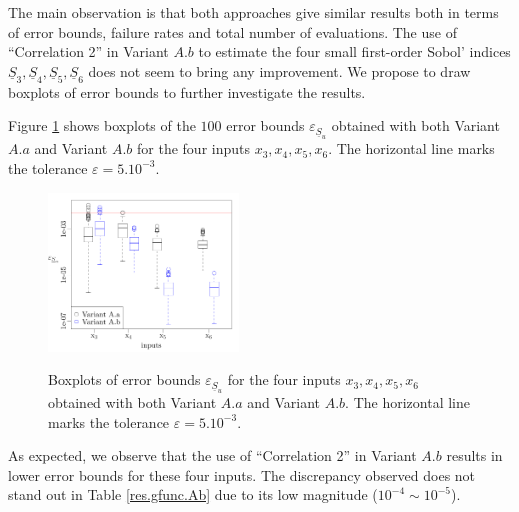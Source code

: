 The main observation is that both approaches give similar results both in terms of error bounds, failure rates and total number of evaluations. The use of ``Correlation 2'' in Variant $A.b$ to estimate the four small first-order Sobol' indices $\underline{S}_3, \underline{S}_4, \underline{S}_5, \underline{S}_6$ does not seem to bring any improvement. We propose to draw boxplots of error bounds to further investigate the results. 

Figure \ref{boxplots.gfunc} shows boxplots of the $100$ error bounds $\varepsilon_{\underline{S}_u}$ obtained with both Variant $A.a$ and Variant $A.b$ for the four inputs $x_3,x_4,x_5,x_6$. The horizontal line marks the tolerance $\varepsilon=5.10^{-3}$.
\begin{figure}[!ht]
\caption{Boxplots of error bounds $\varepsilon_{\underline{S}_u}$ for the four inputs $x_3,x_4,x_5,x_6$ obtained with both Variant $A.a$ and Variant $A.b$. The horizontal line marks the tolerance $\varepsilon=5.10^{-3}$.}
\centering
\includegraphics[width=0.45\textwidth]{Images/boxplots.pdf}
\label{boxplots.gfunc}
\end{figure}
As expected, we observe that the use of ``Correlation 2'' in Variant $A.b$ results in lower error bounds for these four inputs. The discrepancy observed does not stand out in Table \ref{res.gfunc.Ab} due to its low magnitude ($10^{-4} \sim 10^{-5}$).
\bigskip

